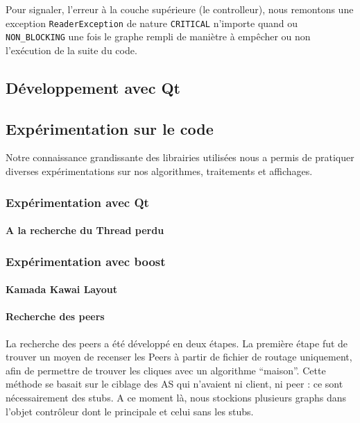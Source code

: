 Pour signaler, l'erreur à la couche supérieure (le controlleur), nous remontons une exception \verb|ReaderException| de nature \verb|CRITICAL| n'importe quand ou \verb|NON_BLOCKING| une fois le graphe rempli de maniètre à empêcher ou non l'exécution de la suite du code.


\subsection{D\'eveloppement avec Qt}



\subsection{Expérimentation sur le code}
Notre connaissance grandissante des librairies utilisées nous a permis de pratiquer diverses expérimentations sur nos algorithmes, traitements et affichages.
\subsubsection{Expérimentation avec Qt}
\paragraph{A la recherche du Thread perdu\\}

\subsubsection{Expérimentation avec boost}

\paragraph{Kamada Kawai Layout}

\paragraph{Recherche des peers\\}
\par La recherche des peers a été développé en deux étapes. La première étape fut de trouver un moyen de recenser les Peers à partir de fichier de routage uniquement, afin de permettre de trouver les cliques avec un algorithme ``maison''. Cette méthode se basait sur le ciblage des AS qui n'avaient ni client, ni peer : ce sont n\'ecessairement des stubs. A ce moment là, nous stockions plusieurs graphs dans l'objet contrôleur dont le principale et celui sans les stubs.


